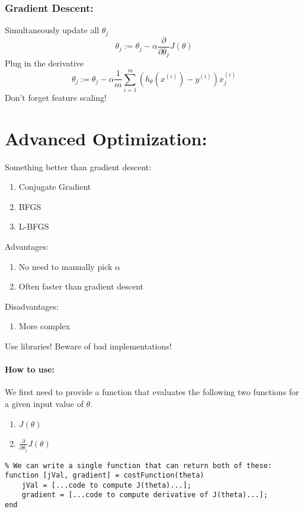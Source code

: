 \subsubsection{Gradient Descent:}
Simultaneously update all $\theta_j$
\begin{equation*}
    \theta_j := \theta_j - \alpha\frac{\partial}{\partial\theta_j}J(\theta)
\end{equation*}
Plug in the derivative
\begin{equation*}
    \theta_j := \theta_j - \alpha\frac{1}{m}\sum_{i=1}^m\left(
    h_\theta(x^{(i)}) - y^{(i)}
    \right)x_j^{(i)}
\end{equation*}
Don't forget feature scaling!

\section{Advanced Optimization:}
Something better than gradient descent:
\begin{enumerate}
    \item Conjugate Gradient
    \item BFGS
    \item L-BFGS
\end{enumerate}
Advantages:
\begin{enumerate}
    \item No need to manually pick $\alpha$
    \item Often faster than gradient descent
\end{enumerate}
Disadvantages:
\begin{enumerate}
    \item More complex
\end{enumerate}
Use libraries! Beware of bad implementations!

\paragraph{How to use:}
We first need to provide a function that evaluates the following two functions
for a given input value of $\theta$.
\begin{enumerate}
    \item $J(\theta)$
    \item $\frac{\partial}{\partial\theta_j}J(\theta)$
\end{enumerate}

\begin{verbatim}
% We can write a single function that can return both of these:
function [jVal, gradient] = costFunction(theta)
	jVal = [...code to compute J(theta)...];
	gradient = [...code to compute derivative of J(theta)...];
end
\end{verbatim}


